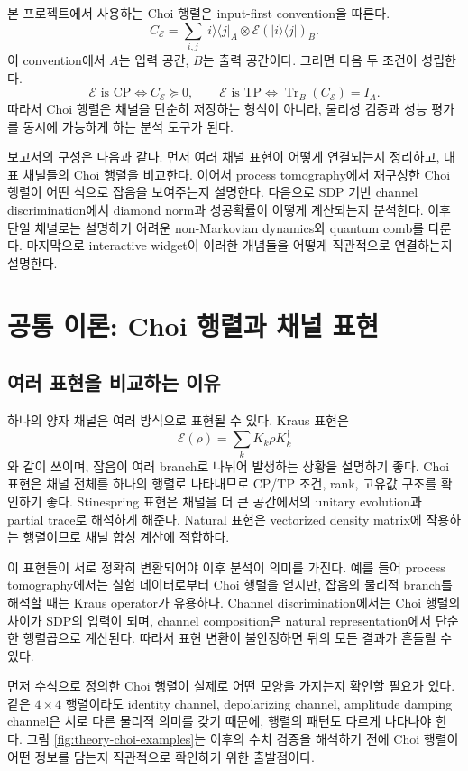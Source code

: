 \documentclass[11pt,a4paper]{article}
\newcommand{\E}{\mathcal{E}}
\newcommand{\Tr}{\operatorname{Tr}}
\begin{document}
본 프로젝트에서 사용하는 Choi 행렬은 input-first convention을 따른다.
\[
C_{\E}
=\sum_{i,j}|i\rangle\langle j|_A\otimes \E(|i\rangle\langle j|)_B .
\]
이 convention에서 $A$는 입력 공간, $B$는 출력 공간이다. 그러면 다음 두 조건이 성립한다.
\[
\E\text{ is CP}\iff C_{\E}\succeq 0,
\qquad
\E\text{ is TP}\iff \Tr_B(C_{\E})=I_A.
\]
따라서 Choi 행렬은 채널을 단순히 저장하는 형식이 아니라, 물리성 검증과 성능 평가를 동시에 가능하게 하는 분석 도구가 된다.

보고서의 구성은 다음과 같다. 먼저 여러 채널 표현이 어떻게 연결되는지 정리하고, 대표 채널들의 Choi 행렬을 비교한다. 이어서 process tomography에서 재구성한 Choi 행렬이 어떤 식으로 잡음을 보여주는지 설명한다. 다음으로 SDP 기반 channel discrimination에서 diamond norm과 성공확률이 어떻게 계산되는지 분석한다. 이후 단일 채널로는 설명하기 어려운 non-Markovian dynamics와 quantum comb를 다룬다. 마지막으로 interactive widget이 이러한 개념들을 어떻게 직관적으로 연결하는지 설명한다.

\section{공통 이론: Choi 행렬과 채널 표현}

\subsection{여러 표현을 비교하는 이유}

하나의 양자 채널은 여러 방식으로 표현될 수 있다. Kraus 표현은
\[
\E(\rho)=\sum_k K_k\rho K_k^\dagger
\]
와 같이 쓰이며, 잡음이 여러 branch로 나뉘어 발생하는 상황을 설명하기 좋다. Choi 표현은 채널 전체를 하나의 행렬로 나타내므로 CP/TP 조건, rank, 고유값 구조를 확인하기 좋다. Stinespring 표현은 채널을 더 큰 공간에서의 unitary evolution과 partial trace로 해석하게 해준다. Natural 표현은 vectorized density matrix에 작용하는 행렬이므로 채널 합성 계산에 적합하다.

이 표현들이 서로 정확히 변환되어야 이후 분석이 의미를 가진다. 예를 들어 process tomography에서는 실험 데이터로부터 Choi 행렬을 얻지만, 잡음의 물리적 branch를 해석할 때는 Kraus operator가 유용하다. Channel discrimination에서는 Choi 행렬의 차이가 SDP의 입력이 되며, channel composition은 natural representation에서 단순한 행렬곱으로 계산된다. 따라서 표현 변환이 불안정하면 뒤의 모든 결과가 흔들릴 수 있다.

먼저 수식으로 정의한 Choi 행렬이 실제로 어떤 모양을 가지는지 확인할 필요가 있다. 같은 $4\times4$ 행렬이라도 identity channel, depolarizing channel, amplitude damping channel은 서로 다른 물리적 의미를 갖기 때문에, 행렬의 패턴도 다르게 나타나야 한다. 그림 \ref{fig:theory-choi-examples}는 이후의 수치 검증을 해석하기 전에 Choi 행렬이 어떤 정보를 담는지 직관적으로 확인하기 위한 출발점이다.
\end{document}
